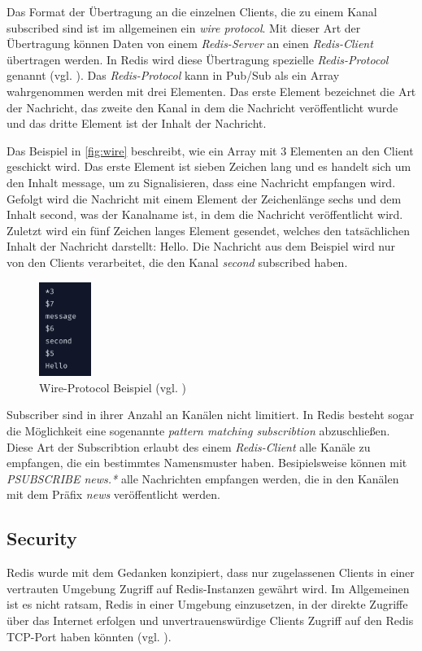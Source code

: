 Das Format der Übertragung an die einzelnen Clients, die zu einem Kanal subscribed sind ist im allgemeinen ein \textit{wire protocol}. Mit dieser Art der Übertragung können Daten von einem \textit{Redis-Server} an einen \textit{Redis-Client} übertragen werden.
In \acs{Redis} wird diese Übertragung spezielle \textit{Redis-Protocol} genannt (vgl. \cite{Redis-PubSub}).
Das \textit{Redis-Protocol} kann in \acs{Pub/Sub} als ein Array wahrgenommen werden mit drei Elementen. Das erste Element bezeichnet die Art der Nachricht, das zweite den Kanal in dem die Nachricht veröffentlicht wurde und das dritte Element ist der Inhalt der Nachricht. 

Das Beispiel in \autoref{fig:wire} beschreibt, wie ein Array mit 3 Elementen an den Client geschickt wird. Das erste Element ist sieben Zeichen lang und es handelt sich um den Inhalt \glqq message\grqq, um zu Signalisieren, dass eine Nachricht empfangen wird. Gefolgt wird die Nachricht mit einem Element der Zeichenlänge sechs und dem Inhalt \glqq second\grqq, was der Kanalname ist, in dem die Nachricht veröffentlicht wird. Zuletzt wird ein fünf Zeichen langes Element gesendet, welches den tatsächlichen Inhalt der Nachricht darstellt: \glqq Hello\grqq.
Die Nachricht aus dem Beispiel wird nur von den Clients verarbeitet, die den Kanal \textit{second} subscribed haben.
\begin{figure}[h]
	\centering
	\includegraphics[width=0.15\textwidth]{images/wire_protocol.png}
	\caption{Wire-Protocol Beispiel (vgl. \cite{Redis-PubSub})}
	\label{fig:wire} 
\end{figure}

Subscriber sind in ihrer Anzahl an Kanälen nicht limitiert. In \acs{Redis} besteht sogar die Möglichkeit eine sogenannte \textit{pattern matching subscribtion} abzuschließen. Diese Art der Subscribtion erlaubt des einem \textit{Redis-Client} alle Kanäle zu empfangen, die ein bestimmtes Namensmuster haben. Besipielsweise können mit \textit{PSUBSCRIBE news.*} alle Nachrichten empfangen werden, die in den Kanälen mit dem Präfix \textit{news} veröffentlicht werden.


\subsection{Security}
\label{subsection:security}
\acs{Redis} wurde mit dem Gedanken konzipiert, dass nur zugelassenen Clients in einer vertrauten Umgebung  Zugriff auf \acs{Redis}-Instanzen gewährt wird. 
Im Allgemeinen ist es nicht ratsam, \acs{Redis} in einer Umgebung einzusetzen, in der direkte Zugriffe über das Internet erfolgen und unvertrauenswürdige Clients Zugriff auf den \acs{Redis} \ac{TCP}-Port haben könnten (vgl. \cite{Redis-Security}).


